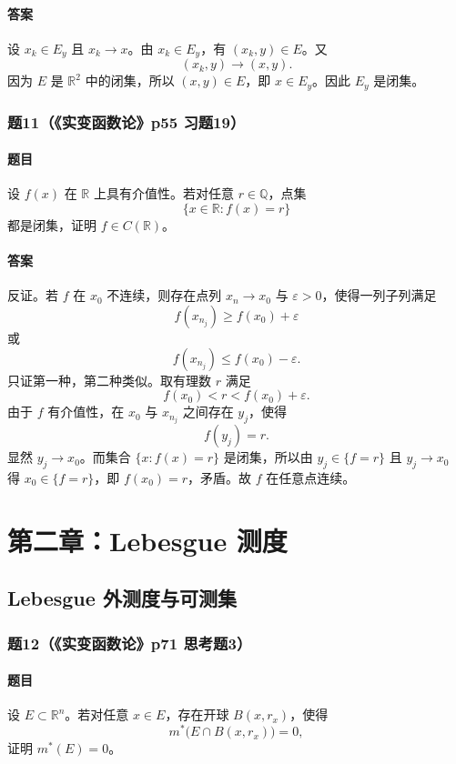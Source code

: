 \documentclass{article}
\newcommand{\R}{\mathbb{R}}
\newcommand{\Q}{\mathbb{Q}}
\newcommand{\eps}{\varepsilon}
\newcommand{\mouter}{m^*}
\begin{document}
	\paragraph{答案}设 $x_k\in E_y$ 且 $x_k\to x$。由 $x_k\in E_y$，有 $(x_k,y)\in E$。又
	\[
	(x_k,y)\to(x,y).
	\]
	因为 $E$ 是 $\R^2$ 中的闭集，所以 $(x,y)\in E$，即 $x\in E_y$。因此 $E_y$ 是闭集。
	
	\subsubsection*{题11（《实变函数论》p55 习题19）}
	\paragraph{题目}设 $f(x)$ 在 $\R$ 上具有介值性。若对任意 $r\in\Q$，点集
	\[
	\{x\in\R:f(x)=r\}
	\]
	都是闭集，证明 $f\in C(\R)$。
	
	\paragraph{答案}反证。若 $f$ 在 $x_0$ 不连续，则存在点列 $x_n\to x_0$ 与 $\eps>0$，使得一列子列满足
	\[
	f(x_{n_j})\ge f(x_0)+\eps
	\]
	或
	\[
	f(x_{n_j})\le f(x_0)-\eps.
	\]
	只证第一种，第二种类似。取有理数 $r$ 满足
	\[
	f(x_0)<r<f(x_0)+\eps.
	\]
	由于 $f$ 有介值性，在 $x_0$ 与 $x_{n_j}$ 之间存在 $y_j$，使得
	\[
	f(y_j)=r.
	\]
	显然 $y_j\to x_0$。而集合 $\{x:f(x)=r\}$ 是闭集，所以由 $y_j\in\{f=r\}$ 且 $y_j\to x_0$ 得 $x_0\in\{f=r\}$，即 $f(x_0)=r$，矛盾。故 $f$ 在任意点连续。
	
	\section{第二章：Lebesgue 测度}
	
	\subsection{Lebesgue 外测度与可测集}
	
	\subsubsection*{题12（《实变函数论》p71 思考题3）}
	\paragraph{题目}设 $E\subset\R^n$。若对任意 $x\in E$，存在开球 $B(x,r_x)$，使得
	\[
	\mouter\bigl(E\cap B(x,r_x)\bigr)=0,
	\]
	证明 $\mouter(E)=0$。
	
\end{document}
